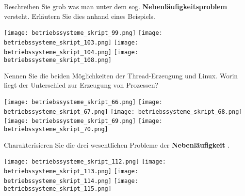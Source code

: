 \documentclass{article}
\begin{document}
\begin{tcolorbox}[colback=white!10!white,colframe=lightgray!75!black,
  savelowerto=\jobname_ex.tex]

\begin{center}
Beschreiben Sie grob was man unter dem sog. 
\textbf{Nebenläufigkeitsproblem
} versteht. Erläutern Sie dies anhand eines Beispiels.

\end{center}

\tcblower

\justifying
\texttt{[image: betriebssysteme\_skript\_99.png]}
\texttt{[image: betriebssysteme\_skript\_103.png]}
\texttt{[image: betriebssysteme\_skript\_104.png]}
\texttt{[image: betriebssysteme\_skript\_108.png]}

\end{tcolorbox}
\begin{tcolorbox}[colback=white!10!white,colframe=lightgray!75!black,
  savelowerto=\jobname_ex.tex]

\begin{center}
Nennen Sie die beiden Möglichkeiten der Thread-Erzeugung und Linux. 
Worin liegt der Unterschied zur Erzeugung von Prozessen?

\end{center}

\tcblower

\justifying
\texttt{[image: betriebssysteme\_skript\_66.png]}
\texttt{[image: betriebssysteme\_skript\_67.png]}
\texttt{[image: betriebssysteme\_skript\_68.png]}
\texttt{[image: betriebssysteme\_skript\_69.png]}
\texttt{[image: betriebssysteme\_skript\_70.png]}

\end{tcolorbox}
\begin{tcolorbox}[colback=white!10!white,colframe=lightgray!75!black,
  savelowerto=\jobname_ex.tex]

\begin{center}
Charakterisieren Sie die drei wesentlichen Probleme der 
\textbf{Nebenläufigkeit
}.

\end{center}

\tcblower

\justifying
\texttt{[image: betriebssysteme\_skript\_112.png]}
\texttt{[image: betriebssysteme\_skript\_113.png]}
\texttt{[image: betriebssysteme\_skript\_114.png]}
\texttt{[image: betriebssysteme\_skript\_115.png]}

\end{tcolorbox}
\end{document}
